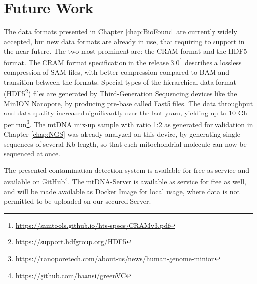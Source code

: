 \section{Future Work}
\label{disc:sec3}
The data formats presented in Chapter \ref{chap:BioFound} are currently widely accepted, but new data formats are already in use, that requiring to support in the near future. The two most prominent are: the CRAM format and the HDF5 format. The CRAM format specification in the release 3.0\footnote{\url{https://samtools.github.io/hts-specs/CRAMv3.pdf}} describes a lossless compression of SAM files, with better compression compared to BAM and transition between the formats. Special types of the hierarchical data format (HDF5\footnote{\url{https://support.hdfgroup.org/HDF5}}) files are generated by Third-Generation Sequencing devices like the MinION Nanopore, by producing pre-base called Fast5 files. The data throughput and data quality increased significantly over the last years, yielding up to 10 Gb per run\footnote{\url{https://nanoporetech.com/about-us/news/human-genome-minion}}. The mtDNA mix-up sample with ratio 1:2 as generated for validation in Chapter \ref{chap:NGS} was already analyzed on this device, by generating single sequences of several Kb length, so that each mitochondrial molecule can now be sequenced at once.

The presented contamination detection system is available for free as service and available on GitHub\footnote{\url{https://github.com/haansi/greenVC}}. %
The mtDNA-Server is available as service for free as well, and will be made available as Docker Image for local usage, where data is not permitted to be uploaded on our secured Server.

